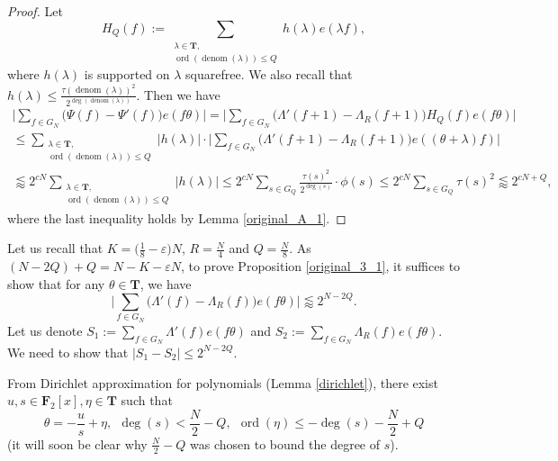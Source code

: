 \documentclass[11pt, reqno]{amsart}
\numberwithin{equation}{section}
\newcommand\eps{\varepsilon}
\newcommand\ord{\operatorname{ord}}
\newcommand\denom{\operatorname{denom}}
\begin{document}
\begin{proof}
    Let
    \begin{equation}
        H_Q(f):=\sum_{\substack{\lambda \in \mathbf{T}, \\ \ord(\denom(\lambda)) \leqslant Q}} h(\lambda)e(\lambda f),
    \end{equation}
    where $h(\lambda)$ is supported on $\lambda$ squarefree. We also recall that $h(\lambda) \leqslant \frac{\tau(\denom(\lambda))^2}{2^{\deg( \denom(\lambda)) }}$. Then we have
    \begin{multline*}
        \bigg| \sum_{f \in G_N} \big(\Psi(f) - \Psi'(f)\big)e(f \theta) \bigg| = \bigg|  \sum_{f \in G_N} \big(\Lambda'(f+1)- \Lambda_R(f+1)\big)H_Q(f)e(f \theta) \bigg|\\ \leqslant \sum_{\substack{\lambda \in \mathbf{T}, \\ \ord(\denom(\lambda)) \leqslant Q}}\big|  h(\lambda) \big| \cdot \bigg| \sum_{f \in G_N} \big(\Lambda'(f+1) - \Lambda_R(f+1) \big) e((\theta + \lambda)f) \bigg|\\ \lessapprox 2^{cN} \sum_{\substack{\lambda \in \mathbf{T}, \\ \ord(\denom(\lambda)) \leqslant Q}} \big|h(\lambda)\big|\leqslant 2^{cN}\sum_{s \in G_Q} \frac{\tau(s)^2}{2^{\deg( s )}} \cdot \phi(s) \leqslant 2^{cN}\sum_{s \in G_Q}\tau(s)^2 \lessapprox 2^{cN+Q},
    \end{multline*}
    where the last inequality holds by Lemma \ref{original_A_1}.
\end{proof}

Let us recall that $K=\big(\frac{1}{8}-\eps\big)N$, $R=\frac{N}{4}$ and $Q=\frac{N}{8}$.
As $(N-2Q)+Q=N-K-\eps N$, to prove Proposition \ref{original_3_1}, it suffices to show that for any $\theta \in \mathbf{T}$, we have $$\bigg| \sum_{f \in G_N} \big( \Lambda'(f) - \Lambda_R(f) \big) e(f \theta) \bigg| \lessapprox 2^{N-2Q}.$$
Let us denote $S_1:=\sum_{f \in G_N} \Lambda'(f) e(f \theta)$ and $S_2 :=\sum_{f \in G_N} \Lambda_R(f) e(f \theta)$. We need to show that $\big| S_1 - S_2 \big| \leq 2^{N-2Q}$.

From Dirichlet approximation for polynomials (Lemma \ref{dirichlet}), there exist $u, s \in \mathbf{F}_2[x], \eta \in \mathbf{T}$ such that
\begin{equation}
    \theta=-\frac{u}{s}+\eta, \ \ \deg(s)<\frac{N}{2}-Q, \ \ \ord(\eta)\leqslant -\deg(s)-\frac{N}{2}+Q
\end{equation}
(it will soon be clear why $\frac{N}{2}-Q$ was chosen to bound the degree of $s$).
\end{document}
